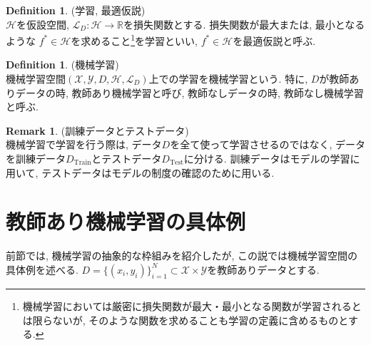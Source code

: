 \documentclass[11pt, a4paper, dvipdfmx]{jsarticle}
\theoremstyle{definition}
\newtheorem{Definition+}[Axiom+]{Definition}
\newtheorem{Remark+}[Axiom+]{Remark}
\newcommand{\R}{\mathbb{R}}
\newcommand{\X}{\mathcal{X}}
\newcommand{\Y}{\mathcal{Y}}
\newcommand{\Hil}{\mathcal{H}}
\newcommand{\Loss}{\mathcal{L}_{D}}
\newcommand{\MLsp}{(\X, \Y, D, \Hil, \Loss)}
\begin{document}
\begin{Definition+}(学習, 最適仮説)\\
    $\Hil$を仮設空間, $\Loss:\Hil\to\R$を損失関数とする. 損失関数が最大または, 最小となるような
    $f^*\in\Hil$を求めること\footnote{機械学習においては厳密に損失関数が最大・最小となる関数が学習されるとは限らないが, そのような関数を求めることも学習の定義に含めるものとする. }を学習といい, $f^*\in\Hil$を最適仮説と呼ぶ.
\end{Definition+}
\begin{Definition+}(機械学習)\\
    機械学習空間$\MLsp$上での学習を機械学習という. 特に, $D$が教師ありデータの時, 教師あり機械学習と呼び, 
    教師なしデータの時, 教師なし機械学習と呼ぶ.
\end{Definition+}
\begin{Remark+}(訓練データとテストデータ)\\
    機械学習で学習を行う際は, データ$D$を全て使って学習させるのではなく, 
    データを訓練データ$D_{\text{Train}}$とテストデータ$D_{\text{Test}}$に分ける. 
    訓練データはモデルの学習に用いて, テストデータはモデルの制度の確認のために用いる. 
\end{Remark+}
\section{教師あり機械学習の具体例}
前節では, 機械学習の抽象的な枠組みを紹介したが, この説では機械学習空間の具体例を述べる.
$D = \{(x_i, y_i)\}_{i = 1}^{N}\subset\X\times\Y$を教師ありデータとする.
\end{document}
